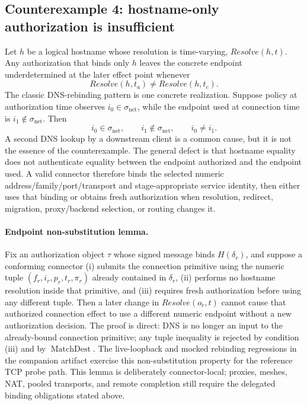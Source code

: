 \documentclass[11pt,letterpaper]{article}
\begin{document}
\subsection{Counterexample 4: hostname-only authorization is insufficient}
\label{sec:dns-counterexample}
Let $h$ be a logical hostname whose resolution is time-varying, $Resolve(h,t)$. Any authorization that binds only $h$ leaves the concrete endpoint underdetermined at the later effect point whenever
\[
Resolve(h,t_a)\neq Resolve(h,t_c).
\]
The classic DNS-rebinding pattern is one concrete realization. Suppose policy at authorization time observes $i_0\in\sigma_{\mathrm{net}}$, while the endpoint used at connection time is $i_1\notin\sigma_{\mathrm{net}}$. Then
\[
i_0\in\sigma_{\mathrm{net}},\qquad i_1\notin\sigma_{\mathrm{net}},\qquad i_0\neq i_1.
\]
A second DNS lookup by a downstream client is a common cause, but it is not the essence of the counterexample. The general defect is that hostname equality does not authenticate equality between the endpoint authorized and the endpoint used. A valid connector therefore binds the selected numeric address/family/port/transport and stage-appropriate service identity, then either uses that binding or obtains fresh authorization when resolution, redirect, migration, proxy/backend selection, or routing changes it.\cite{jackson2009,owasp-ssrf}

\paragraph{Endpoint non-substitution lemma.}
Fix an authorization object $\tau$ whose signed message binds $H(\delta_r)$, and suppose a conforming connector (i) submits the connection primitive using the numeric tuple $(f_r,i_r,p_r,t_r,\pi_r)$ already contained in $\delta_r$, (ii) performs no hostname resolution inside that primitive, and (iii) requires fresh authorization before using any different tuple. Then a later change in $Resolve(o_r,t)$ cannot cause that authorized connection effect to use a different numeric endpoint without a new authorization decision. The proof is direct: DNS is no longer an input to the already-bound connection primitive; any tuple inequality is rejected by condition (iii) and by $\operatorname{MatchDest}$. The live-loopback and mocked rebinding regressions in the companion artifact exercise this non-substitution property for the reference TCP probe path. This lemma is deliberately connector-local; proxies, meshes, NAT, pooled transports, and remote completion still require the delegated binding obligations stated above.
\end{document}
